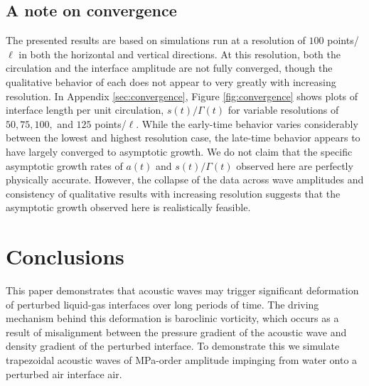\documentclass{jfm}%
\begin{document}
\subsection{A note on convergence}
The presented results are based on simulations run at a resolution of
$100$ points/$\ell$ in both the horizontal and vertical directions. At
this resolution, both the circulation and the interface amplitude are
not fully converged, though the qualitative behavior of each does not
appear to very greatly with increasing resolution. In Appendix
\ref{sec:convergence}, Figure \ref{fig:convergence} shows plots of
interface length per unit circulation, $s(t)/\Gamma(t)$ for variable
resolutions of $50, 75, 100,$ and $125$ points/$\ell$. While the
early-time behavior varies considerably between the lowest and highest
resolution case, the late-time behavior appears to have largely
converged to asymptotic growth. We do not claim that the specific
asymptotic growth rates of $a(t)$ and $s(t)/\Gamma(t)$ observed here
are perfectly physically accurate. However, the collapse of the data
across wave amplitudes and consistency of qualitative results with
increasing resolution suggests that the asymptotic growth observed
here is realistically feasible.%

\section{Conclusions}
\label{sec:conclusions}
This paper demonstrates that acoustic waves may trigger significant
deformation of perturbed liquid-gas interfaces over long periods of
time. The driving mechanism behind this deformation is baroclinic
vorticity, which occurs as a result of misalignment between the
pressure gradient of the acoustic wave and density gradient of the
perturbed interface. To demonstrate this we simulate trapezoidal
acoustic waves of MPa-order amplitude impinging from water onto a
perturbed air interface air.
\end{document}
